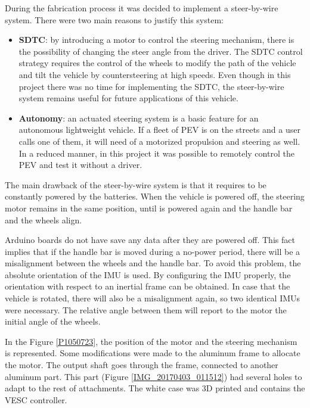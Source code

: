 During the fabrication process it was decided to implement a steer-by-wire system. There were two main reasons to justify this system:
\begin{itemize}
\begin{itemize}
\item \textbf{SDTC}: by introducing a motor to control the steering mechanism, there is the possibility of changing the steer angle from the driver. The SDTC control strategy requires the control of the wheels to modify the path of the vehicle and tilt the vehicle by countersteering at high speeds. Even though in this project there was no time for implementing the SDTC, the steer-by-wire system remains useful for future applications of this vehicle.

\item \textbf{Autonomy}: an actuated steering system is a basic feature for an autonomous lightweight vehicle. If a fleet of PEV is on the streets and a user calls one of them, it will need of a motorized propulsion and steering as well. In a reduced manner, in this project it was possible to remotely control the PEV and test it without a driver.
\end{itemize}
\end{itemize}

The main drawback of the steer-by-wire system is that it requires to be constantly powered by the batteries. When the vehicle is powered off, the steering motor remains in the same position, until is powered again and the handle bar and the wheels align. 

Arduino boards do not have save any data after they are powered off. This fact implies that if the handle bar is moved during a no-power period, there will be a misalignment between the wheels and the handle bar. To avoid this problem, the absolute orientation of the IMU is used. By configuring the IMU properly, the orientation with respect to an inertial frame can be obtained. In case that the vehicle is rotated, there will also be a misalignment again, so two identical IMUs were necessary. The relative angle between them will report to the motor the initial angle of the wheels.
 
In the Figure \ref{P1050723}, the position of the motor and the steering mechanism is represented. Some modifications were made to the aluminum frame to allocate the motor. The output shaft goes through the frame, connected to another aluminum part. This part (Figure \ref{IMG_20170403_011512}) had several holes to adapt to the rest of attachments. The white case was 3D printed and contains the VESC controller.

